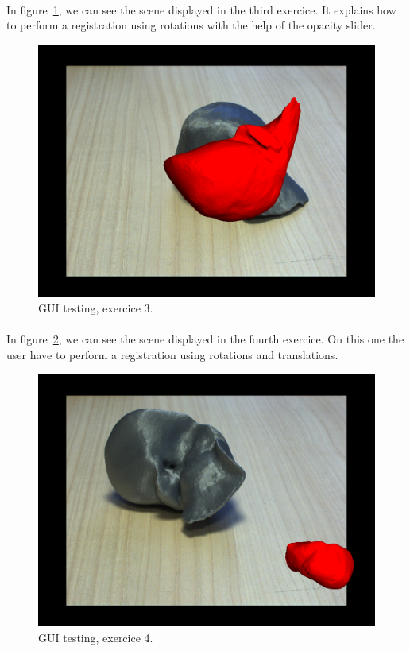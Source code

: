 \documentclass[12pt]{report}
\begin{document}
\paragraph{}
	In figure~\ref{exercice3}, we can see the scene displayed in the third exercice. It explains how to perform a registration using rotations with the help of the opacity slider.

\vspace{10pt}
\begin{figure}[H]
\centerline{\includegraphics[scale = 0.3]{img/exercice3.png}}
\caption{GUI testing, exercice 3.}
\label{exercice3}
\end{figure}

\paragraph{}
	In figure~\ref{exercice4}, we can see the scene displayed in the fourth exercice. On this one the user have to perform a registration using rotations and translations.

\vspace{10pt}
\begin{figure}[H]
\centerline{\includegraphics[scale = 0.3]{img/exercice4.png}}
\caption{GUI testing, exercice 4.}
\label{exercice4}
\end{figure}
\end{document}
